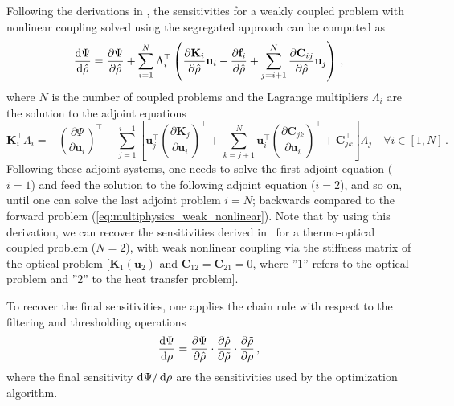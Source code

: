  Following the derivations in , the sensitivities for a weakly coupled problem with nonlinear coupling solved using the segregated
 approach can be computed as
    \begin{equation}
 \frac{\mathop{}\!\text{d} \Psi}{\mathop{}\!\text{d} \hat{\rho}}  = \frac{\partial \Psi}{\partial \hat{\rho}} + \sum^N_{i=1} \Lambda_{i}^{\top} \left( \frac{\partial \mathbf{K}_i}{\partial \hat{\rho}} \mathbf{u}_i - \frac{\partial \mathbf{f}_i}{\partial \hat{\rho}} + \sum^N_{j=i+1} \frac{\partial \mathbf{C}_{ij}}{\partial \hat{\rho}} \mathbf{u}_j \right)\,,
    \end{equation}
 where $N$ is the number of coupled problems and the Lagrange multipliers $\Lambda_i$ are the solution to the adjoint equations
    \begin{equation}\label{eq:adjoint_eqs}
        \mathbf{K}^\top_i \Lambda_i = -\left(\frac{\partial \Psi}{\partial \mathbf{u}_i}\right)^\top - \sum_{j=1}^{i-1} \left[ 
            \mathbf{u}^\top_j \left(\frac{\partial \mathbf{K}_j}{\partial \mathbf{u}_i}\right)^\top  + \sum^N_{k=j+1} \mathbf{u}^\top_i \left(\frac{\partial \mathbf{C}_{jk}}{\partial \mathbf{u}_i}\right)^\top + \mathbf{C}^\top_{jk} \right]\Lambda_j  \quad \forall i \in [1, N] \,.
   \end{equation}
 Following these adjoint systems, one needs to solve the first adjoint equation ($i=1$) 
 and feed the solution to the following adjoint equation ($i=2$), and so on, until one can solve the last adjoint problem $i=N$; backwards compared to the forward problem (\eqref{eq:multiphysics_weak_nonlinear}).
 Note that by using this derivation, we can recover the sensitivities derived in~\cite{ownpub0} for a thermo-optical coupled problem ($N=2$), with weak nonlinear coupling
 via the stiffness matrix of the optical problem [$\mathbf{K}_1(\mathbf{u}_2)$ and $\mathbf{C}_{12}=\mathbf{C}_{21}=0$, where ''$1$'' refers to the optical problem and ''$2$'' to the 
 heat transfer problem].
    
 To recover the final sensitivities, one applies the chain rule with respect to the filtering and thresholding operations
    \begin{equation}
 \frac{\mathop{}\!\text{d} \Psi}{\mathop{}\!\text{d} \rho} = \frac{\partial \Psi}{\partial \hat{\rho}} \cdot \frac{\partial \hat{\rho}}{\partial \tilde{\rho}} \cdot \frac{\partial \tilde{\rho}}{\partial \rho}\,,
    \end{equation}
 where the final sensitivity $\mathop{}\!\text{d} \Psi/\mathop{}\!\text{d} \rho$ are the sensitivities used by the optimization algorithm.



